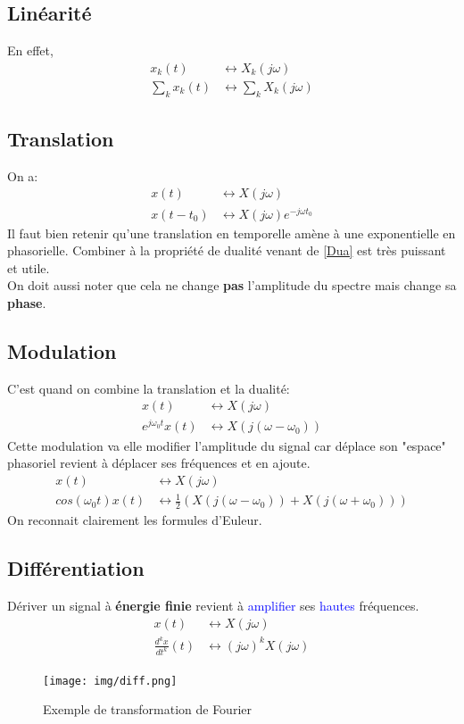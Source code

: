 \documentclass{report}
\begin{document}
\subsection{Linéarité}
En effet,
\begin{align*}
x_k(t) & \longleftrightarrow X_k(j\omega)\\
\sum_k x_k(t) & \longleftrightarrow \sum_k X_k(j\omega)
\end{align*}

\subsection{Translation}
On a:
\begin{align*}
x(t) & \longleftrightarrow X(j\omega)\\
x(t-t_0) & \longleftrightarrow X(j\omega)e^{-j \omega t_0}
\end{align*}
Il faut bien retenir qu'une translation en temporelle amène à une exponentielle en phasorielle. Combiner à la propriété de dualité venant de \ref{Dua} est très puissant et utile.\\
On doit aussi noter que cela ne change \textbf{pas} l'amplitude du spectre mais change sa \textbf{phase}.

\subsection{Modulation}
C'est quand on combine la translation et la dualité:
\begin{align*}
x(t) & \longleftrightarrow X(j\omega)\\
e^{j\omega_0 t}x(t) & \longleftrightarrow X(j(\omega - \omega_0))
\end{align*}
Cette modulation va elle modifier l'amplitude du signal car déplace son "espace" phasoriel revient à déplacer ses fréquences et en ajoute.
\begin{align*}
x(t) & \longleftrightarrow X(j\omega)\\
cos(\omega_0 t)x(t) &\longleftrightarrow \frac{1}{2}(X(j(\omega - \omega_0)) + X(j(\omega + \omega_0))) 
\end{align*}
On reconnait clairement les formules d'Euleur.

\subsection{Différentiation}
Dériver un signal à \textbf{énergie finie} revient à \textcolor{blue}{amplifier} ses \textcolor{blue}{hautes} fréquences.
\begin{align*}
x(t) &\longleftrightarrow X(j\omega)\\
\frac{d^kx}{dt^k}(t) &\longleftrightarrow (j\omega)^kX(j\omega)
\end{align*}
\begin{figure}[H]
\centering
\texttt{[image: img/diff.png]}
\caption{Exemple de transformation de Fourier}
\end{figure}
\end{document}
